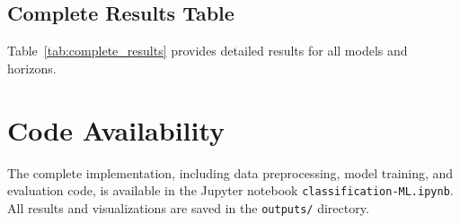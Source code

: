 \documentclass[12pt,a4paper]{article}
\begin{document}
\subsection{Complete Results Table}

Table~\ref{tab:complete_results} provides detailed results for all models and horizons.



\section{Code Availability}

The complete implementation, including data preprocessing, model training, and evaluation code, is available in the Jupyter notebook \texttt{classification-ML.ipynb}. All results and visualizations are saved in the \texttt{outputs/} directory.
\end{document}
